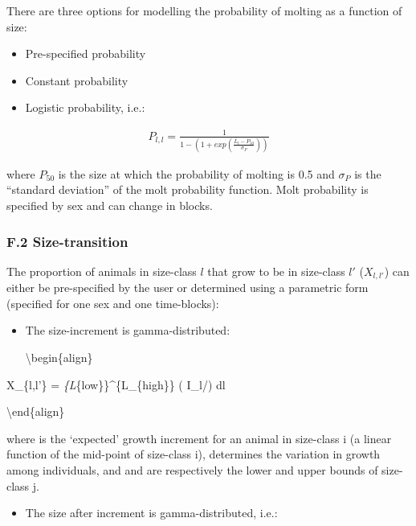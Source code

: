 \documentclass[]{article}
\providecommand{\tightlist}{%
  \setlength{\itemsep}{0pt}\setlength{\parskip}{0pt}}
\begin{document}
There are three options for modelling the probability of molting as a
function of size:

\begin{itemize}
\tightlist
\item
  Pre-specified probability
\item
  Constant probability
\item
  Logistic probability, i.e.:
\end{itemize}

\begin{align}
  P_{l,l} = \frac {1}{1-(1+exp(\frac{\bar{L}_{l}-P_{50}}{\sigma_{P}}))}
 \end{align}

where \(P_{50}\) is the size at which the probability of molting is 0.5
and \(\sigma_{P}\) is the ``standard deviation'' of the molt probability
function. Molt probability is specified by sex and can change in blocks.

\hypertarget{f.2-size-transition}{%
\subsubsection{F.2 Size-transition}\label{f.2-size-transition}}

The proportion of animals in size-class \(l\) that grow to be in
size-class \(l'\) (\(X_{l,l'}\)) can either be pre-specified by the user
or determined using a parametric form (specified for one sex and one
time-blocks):

\begin{itemize}
\item
  The size-increment is gamma-distributed:

  \textbackslash{}begin\{align\}
\end{itemize}

X\_\{l,l'\} = \int\emph{\{L}\{low\}\}\^{}\{L\_\{high\}\}
                                          {\Gamma( I_{l}/\tilde{\beta})}
dl

\textbackslash{}end\{align\}

where is the `expected' growth increment for an animal in size-class i
(a linear function of the mid-point of size-class i), determines the
variation in growth among individuals, and and are respectively the
lower and upper bounds of size-class j.

\begin{itemize}
\tightlist
\item
  The size after increment is gamma-distributed, i.e.:
\end{itemize}
\end{document}
